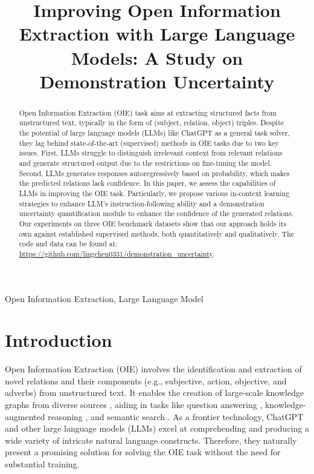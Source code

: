 \documentclass{article}
\title{Improving Open Information Extraction with Large Language Models: A Study on Demonstration Uncertainty}
\begin{document}
\address{Emory University,
NEC Labs,
Microsoft,
NEC Corporation
}
\maketitle
\begin{abstract}
Open Information Extraction (OIE) task aims at extracting structured facts from unstructured text, typically in the form of (subject, relation, object) triples. Despite the potential of large language models (LLMs) like ChatGPT as a general task solver, they lag behind state-of-the-art (supervised) methods in OIE tasks due to two key issues. First, LLMs struggle to distinguish irrelevant context from relevant relations and generate structured output due to the restrictions on fine-tuning the model. Second, LLMs generates responses autoregressively based on probability, which makes the predicted relations lack confidence. In this paper, we assess the capabilities of LLMs in improving the OIE task. Particularly, we propose various in-context learning strategies to enhance LLM's instruction-following ability and a demonstration uncertainty quantification module to enhance the confidence of the generated relations. Our experiments on three OIE benchmark datasets show that our approach holds its own against established supervised methods, both quantitatively and qualitatively. 
The code and data can be found at: \url{https://github.com/lingchen0331/demonstration_uncertainty}.
\end{abstract}
\begin{keywords}
Open Information Extraction, Large Language Model
\end{keywords}
\section{Introduction}
Open Information Extraction (OIE) \cite{zhou2022survey} involves the identification and extraction of novel relations and their components (e.g., subjective, action, objective, and adverbs) from unstructured text. It enables the creation of large-scale knowledge graphs from diverse sources \cite{wang2018information}, aiding in tasks like question answering \cite{ling2023knowledge}, knowledge-augmented reasoning \cite{chowdhury2023knowledge}, and semantic search \cite{niklaus2018survey}. As a frontier technology, ChatGPT \cite{ouyang2022training} and other large language models (LLMs) \cite{ling2023beyond} excel at comprehending and producing a wide variety of intricate natural language constructs. Therefore, they naturally present a promising solution for solving the OIE task without the need for substantial training. 
\end{document}
